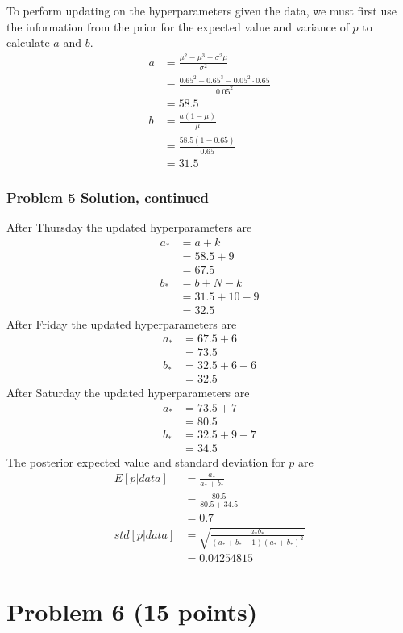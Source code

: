 \documentclass[12pt]{article}
\theoremstyle{definition}
\begin{document}
To perform updating on the hyperparameters given the data, we must first use the information from the prior for the expected value and variance of $p$ to calculate $a$ and $b$.
\begin{align*}
a &= \frac{\mu^2 - \mu^3 - \sigma^2 \mu}{\sigma^2}\\
&= \frac{0.65^2 - 0.65^3 -  0.05^2 \cdot 0.65}{0.05^2}\\
&= 58.5\\
b &= \frac{a(1 - \mu)}{\mu}\\
&= \frac{58.5(1-0.65)}{0.65}\\
&= 31.5
\end{align*}\newpage
\subsubsection*{Problem 5 Solution, continued}

After Thursday the updated hyperparameters are
\begin{align*}
a_* &= a + k\\
&= 58.5 + 9\\
&= 67.5\\
b_* &= b + N - k\\
&= 31.5 + 10 - 9\\
&= 32.5
\end{align*}
After Friday the updated hyperparameters are
\begin{align*}
a_* &= 67.5 + 6\\
&= 73.5\\
b_* &= 32.5 + 6 - 6\\
&= 32.5
\end{align*}
After Saturday the updated hyperparameters are
\begin{align*}
a_* &= 73.5 + 7\\
&= 80.5\\
b_* &= 32.5 + 9 - 7\\
&= 34.5
\end{align*}
The posterior expected value and standard deviation for $p$ are
\begin{align*}
E[p|data] &= \frac{a_*}{a_* + b_*}\\
&= \frac{80.5}{80.5 + 34.5}\\
&= 0.7\\
std[p|data] &= \sqrt{\frac{a_* b_*}{(a_* + b_* + 1)(a_* + b_*)^2}}\\
&= 0.04254815
\end{align*}
\newpage
\section*{Problem 6 (15 points)}
\end{document}

